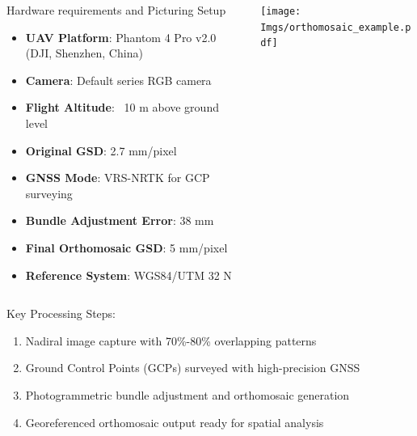 \documentclass[aspectratio=43]{beamer}
\begin{document}
\begin{frame}
    \begin{columns}
        \begin{column}{0.65\textwidth}
                \begin{block}{\small Hardware requirements and Picturing Setup}
                    \small
                    \begin{itemize}
                        \item \textbf{UAV Platform}: Phantom 4 Pro v2.0 (DJI, Shenzhen, China)
                        \item \textbf{Camera}: Default series RGB camera
                        \item \textbf{Flight Altitude}: ~10 m above ground level
                        \item \textbf{Original GSD}: 2.7 mm/pixel
                        \item \textbf{GNSS Mode}: VRS-NRTK for GCP surveying
                        \item \textbf{Bundle Adjustment Error}: 38 mm
                        \item \textbf{Final Orthomosaic GSD}: 5 mm/pixel
                        \item \textbf{Reference System}: WGS84/UTM 32 N
                    \end{itemize}
                \end{block}
        \end{column}        
        \begin{column}{0.35\textwidth}
            \begin{center}
                \texttt{[image: Imgs/orthomosaic\_example.pdf]}
            \end{center}
        \end{column}
    \end{columns}
    \begin{block}{\small Key Processing Steps:}
        \small
        \begin{enumerate}
            \item Nadiral image capture with 70\%-80\% overlapping patterns
            \item Ground Control Points (GCPs) surveyed with high-precision GNSS
            \item Photogrammetric bundle adjustment and orthomosaic generation
            \item Georeferenced orthomosaic output ready for spatial analysis
        \end{enumerate}
    \end{block}
\end{frame}
\end{document}
